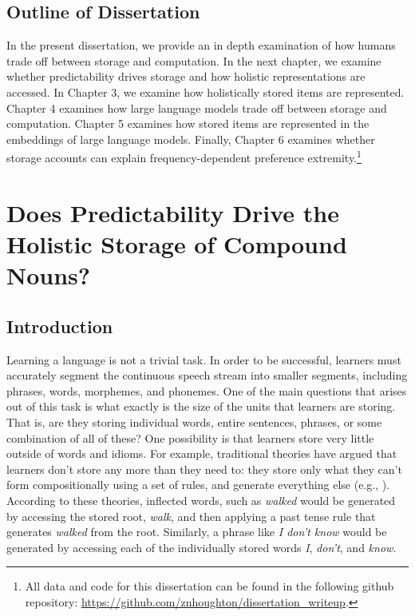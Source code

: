 \documentclass[
  12pt,
  letterpaper,
]{scrreprt}
\begin{document}
\section{Outline of Dissertation}\label{sec-outline-of-dissertation}

In the present dissertation, we provide an in depth examination of how
humans trade off between storage and computation. In the next chapter,
we examine whether predictability drives storage and how holistic
representations are accessed. In Chapter 3, we examine how holistically
stored items are represented. Chapter 4 examines how large language
models trade off between storage and computation. Chapter 5 examines how
stored items are represented in the embeddings of large language models.
Finally, Chapter 6 examines whether storage accounts can explain
frequency-dependent preference extremity.\footnote{All data and code for
  this dissertation can be found in the following github repository:
  \url{https://github.com/znhoughton/dissertation_writeup}.}


\chapter{Does Predictability Drive the Holistic Storage of Compound
Nouns?}\label{does-predictability-drive-the-holistic-storage-of-compound-nouns}

\section{Introduction}\label{introduction-1}

Learning a language is not a trivial task. In order to be successful,
learners must accurately segment the continuous speech stream into
smaller segments, including phrases, words, morphemes, and phonemes. One
of the main questions that arises out of this task is what exactly is
the size of the units that learners are storing. That is, are they
storing individual words, entire sentences, phrases, or some combination
of all of these? One possibility is that learners store very little
outside of words and idioms. For example, traditional theories have
argued that learners don't store any more than they need to: they store
only what they can't form compositionally using a set of rules, and
generate everything else (e.g., ). According to these theories, inflected words, such as
\emph{walked} would be generated by accessing the stored root,
\emph{walk}, and then applying a past tense rule that generates
\emph{walked} from the root. Similarly, a phrase like \emph{I don't
know} would be generated by accessing each of the individually stored
words \emph{I}, \emph{don't}, and \emph{know}.
\end{document}
